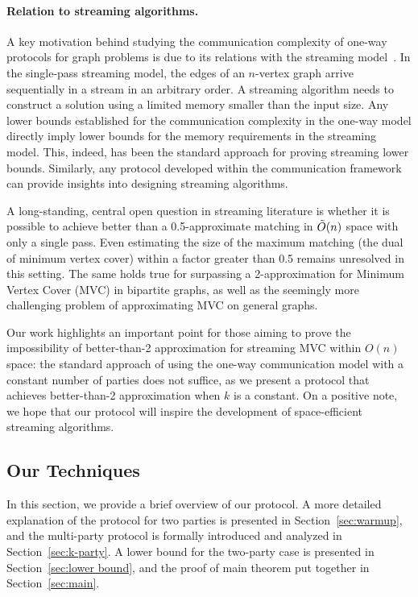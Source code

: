 \documentclass[11pt]{article}
\begin{document}
\paragraph*{Relation to streaming algorithms.} A key motivation behind studying the communication complexity of one-way protocols for graph problems is due to its relations with the streaming model~\cite{feigenbaum2005graph}. In the single-pass streaming model, the edges of an $n$-vertex graph arrive sequentially in a stream in an arbitrary order. A streaming algorithm needs to construct a solution using a limited memory smaller than the input size.  Any lower bounds established for the communication complexity in the one-way model directly imply lower bounds for the memory requirements in the streaming model. This, indeed, has been the standard approach for proving streaming lower bounds. Similarly, any protocol developed within the communication framework can provide insights into designing streaming algorithms.


A long-standing, central open question in streaming literature is whether it is possible to achieve better than a 0.5-approximate matching in \( \Tilde{O}(n) \) space with only a single pass. Even estimating the size of the maximum matching (the dual of minimum vertex cover) within a factor greater than 0.5 remains unresolved in this setting. The same holds true for surpassing a 2-approximation for Minimum Vertex Cover (MVC) in bipartite graphs, as well as the seemingly more challenging problem of approximating MVC on general graphs.

Our work highlights an important point for those aiming to prove the impossibility of better-than-2 approximation for streaming MVC within \( O(n) \) space: the standard approach of using the one-way communication model with a constant number of parties does not suffice, as we present a protocol that achieves better-than-2 approximation when \( k \) is a constant. On a positive note, we hope that our protocol will inspire the development of space-efficient streaming algorithms.


\subsection{Our Techniques}
In this section, we provide a brief overview of our protocol. A more detailed explanation of the protocol for two parties is presented in Section~\ref{sec:warmup}, and the multi-party protocol is formally introduced and analyzed in Section~\ref{sec:k-party}.  A lower bound for the two-party case is presented in Section~\ref{sec:lower bound}, and the proof of main theorem put together in Section~\ref{sec:main}.  
\end{document}
